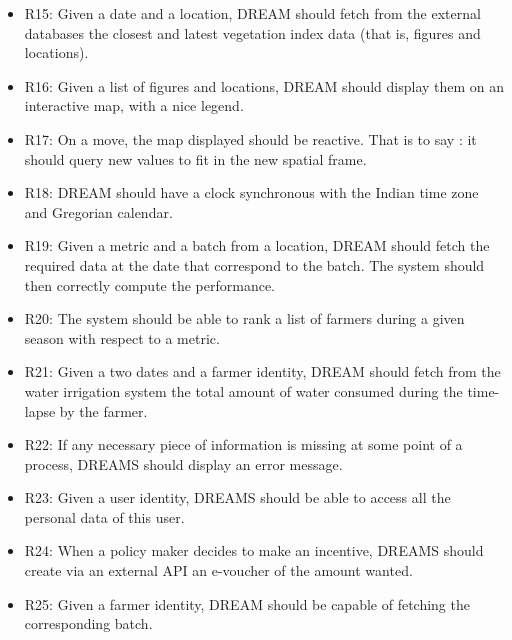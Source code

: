 \begin{itemize}
	\item
	R15: Given a date and a location, DREAM should fetch from the external databases the  closest and latest vegetation index data (that is, figures and locations).
	\item
	R16: Given a list of figures and locations, DREAM should display them on an interactive map, with a nice legend.
	\item
	R17: On a move, the map displayed should be reactive. That is to say : it should query new values to fit in the new spatial frame.
	\item
	R18: DREAM should have a clock synchronous with the Indian time zone and Gregorian calendar.
	\item
	R19: Given a metric and a batch from a location, DREAM should fetch the required data at the date that correspond to the batch. The system should then correctly compute the performance.
	\item
	R20: The system should be able to rank a list of farmers during a given season with respect to a metric.
	\item
	R21: Given a two dates and a farmer identity, DREAM should fetch from the water irrigation system the total amount of water consumed during the time-lapse by the farmer.
	\item
	R22: If any necessary piece of information is missing at some point of a process, DREAMS should display an error message.
	\item
	R23: Given a user identity, DREAMS should be able to access all the personal data of this user.
	\item
	R24: When a policy maker decides to make an incentive, DREAMS should create via an external API an e-voucher of the amount wanted. 
	\item
	R25: Given a farmer identity, DREAM should be capable of fetching the corresponding batch.

\end{itemize}

